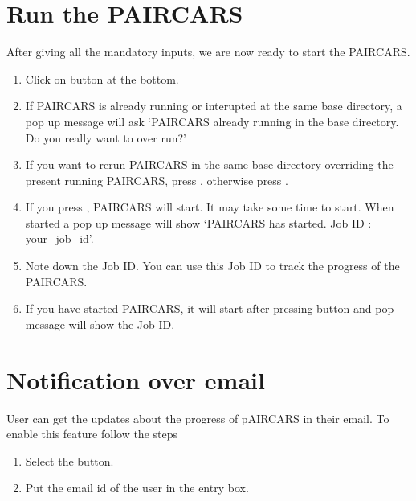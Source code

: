 \documentclass[letterpaper,10pt,english]{sphinxmanual}
\begin{document}
\section{Run the P\sphinxhyphen{}AIRCARS}
\label{\detokenize{tut:run-the-p-aircars}}
\sphinxAtStartPar
After giving all the mandatory inputs, we are now ready to start the P\sphinxhyphen{}AIRCARS.
\begin{enumerate}
%
\item {} 
\sphinxAtStartPar
Click on  button at the bottom.

\item {} 
\sphinxAtStartPar
If P\sphinxhyphen{}AIRCARS is already running or interupted at the same base directory, a pop up message will ask ‘P\sphinxhyphen{}AIRCARS already running in the base directory. Do you really want to over run?’

\item {} 
\sphinxAtStartPar
If you want to re\sphinxhyphen{}run P\sphinxhyphen{}AIRCARS in the same base directory overriding the present running P\sphinxhyphen{}AIRCARS, press  , otherwise press .

\item {} 
\sphinxAtStartPar
If you press , P\sphinxhyphen{}AIRCARS will start. It may take some time to start. When started a pop up message will show ‘P\sphinxhyphen{}AIRCARS has started. Job ID : your\_job\_id’.

\item {} 
\sphinxAtStartPar
Note down the Job ID. You can use this Job ID to track the progress of the P\sphinxhyphen{}AIRCARS.

\item {} 
\sphinxAtStartPar
If you have started P\sphinxhyphen{}AIRCARS, it will start after pressing  button and pop message will show the Job ID.

\end{enumerate}


\section{Notification over e\sphinxhyphen{}mail}
\label{\detokenize{tut:notification-over-e-mail}}
\sphinxAtStartPar
User can get the updates about the progress of p\sphinxhyphen{}AIRCARS in their e\sphinxhyphen{}mail. To enable this feature follow the steps
\begin{enumerate}
%
\item {} 
\sphinxAtStartPar
Select the  button.

\item {} 
\sphinxAtStartPar
Put the e\sphinxhyphen{}mail id of the user in the  entry box.

\end{enumerate}
\end{document}

